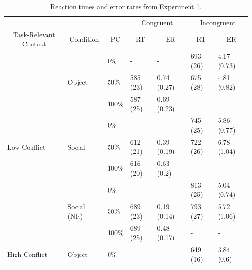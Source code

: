 \documentclass[english,,man,floatsintext]{apa6}
\begin{document}
\begin{table}[htbp]
\caption{Reaction times and error rates from Experiment 1.}
\label{TR_table}
\centering
\begin{tabular}{lllcccc}
\toprule
 & & & \multicolumn{2}{c}{Congruent} & \multicolumn{2}{c}{Incongruent} \\
\cmidrule(rl){4-5}
\cmidrule(rl){6-7}
\multicolumn{1}{c}{Task-Relevant Context} & \multicolumn{1}{c}{Condition} & \multicolumn{1}{c}{PC} & \multicolumn{1}{c}{RT} & \multicolumn{1}{c}{ER} & \multicolumn{1}{c}{RT} & \multicolumn{1}{c}{ER}  \\
\midrule
\multirow{9}{*}{Low Conflict} & \multirow{3}{*}{Object} & \multicolumn{1}{l}{0\%} & \multicolumn{1}{l}{-} & \multicolumn{1}{l}{-} & \multicolumn{1}{l}{693 (26)} & \multicolumn{1}{l}{4.17 (0.73)} \\
& & \multicolumn{1}{l}{50\%} & \multicolumn{1}{l}{585 (23)} & \multicolumn{1}{l}{0.74 (0.27)} & \multicolumn{1}{l}{675 (28)} & \multicolumn{1}{l}{4.81 (0.82)} \\
& & \multicolumn{1}{l}{100\%} & \multicolumn{1}{l}{587 (25)} & \multicolumn{1}{l}{0.69 (0.23)} & \multicolumn{1}{l}{-} & \multicolumn{1}{l}{-} \\
\cmidrule(rl){2-7}
& \multirow{3}{*}{Social} & \multicolumn{1}{l}{0\%} & \multicolumn{1}{c}{-} & \multicolumn{1}{l}{-} & \multicolumn{1}{l}{745 (25)} & \multicolumn{1}{l}{5.86 (0.77)} \\
& & \multicolumn{1}{l}{50\%} & \multicolumn{1}{l}{612 (21)} & \multicolumn{1}{l}{0.39 (0.19)} & \multicolumn{1}{l}{722 (26)} & \multicolumn{1}{l}{6.78 (1.04)} \\
& & \multicolumn{1}{l}{100\%} & \multicolumn{1}{l}{616 (20)} & \multicolumn{1}{l}{0.63 (0.2)} & \multicolumn{1}{l}{-} & \multicolumn{1}{l}{-} \\
\cmidrule(rl){2-7}
& \multirow{3}{*}{Social (NR)} & \multicolumn{1}{l}{0\%} & \multicolumn{1}{l}{-} & \multicolumn{1}{l}{-} & \multicolumn{1}{l}{813 (25)} & \multicolumn{1}{l}{5.04 (0.74)} \\
& & \multicolumn{1}{l}{50\%} & \multicolumn{1}{l}{689 (23)} & \multicolumn{1}{l}{0.19 (0.14)} & \multicolumn{1}{l}{793 (27)} & \multicolumn{1}{l}{5.72 (1.06)} \\
& & \multicolumn{1}{l}{100\%} & \multicolumn{1}{l}{689 (25)} & \multicolumn{1}{l}{0.48 (0.17)} & \multicolumn{1}{l}{-} & \multicolumn{1}{l}{-} \\
\midrule
\multirow{9}{*}{High Conflict} & \multirow{3}{*}{Object} & \multicolumn{1}{l}{0\%} & \multicolumn{1}{l}{-} & \multicolumn{1}{l}{-} & \multicolumn{1}{l}{649 (16)} & \multicolumn{1}{l}{3.84 (0.6)} \\

\end{tabular}
\end{table}
\end{document}
